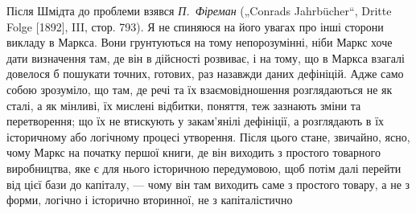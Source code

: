 Після Шмідта до проблеми взявся \emph{П.~Фіреман} („Conrads
Jahrbücher“, Dritte Folge [1892], III, стор. 793). Я не спиняюся на
його увагах про інші сторони викладу в Маркса. Вони грунтуються
на тому непорозумінні, ніби Маркс хоче дати визначення
там, де він в дійсності розвиває, і на тому, що в Маркса взагалі
довелося б пошукати точних, готових, раз назавжди даних
дефініцій. Адже само собою зрозуміло, що там, де речі та їх
взаємовідношення розглядаються не як сталі, а як мінливі, їх
мислені відбитки, поняття, теж зазнають зміни та перетворення;
що їх не втискують у закам’янілі дефініції, а розглядають в їх
історичному або логічному процесі утворення. Після цього стане,
звичайно, ясно, чому Маркс на початку першої книги, де він
виходить з простого товарного виробництва, яке є для нього
історичною передумовою, щоб потім далі перейти від цієї бази
до капіталу, — чому він там виходить саме з простого товару,
а не з форми, логічно і історично вторинної, не з капіталістично
\parbreak{}  %
